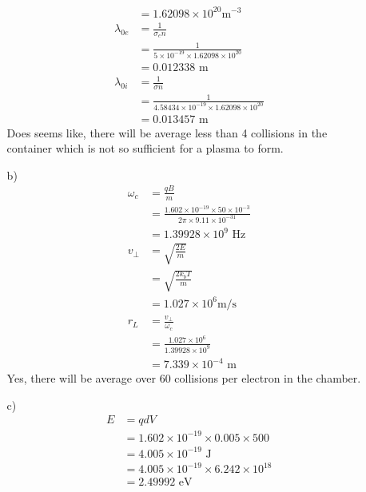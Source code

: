 \documentclass{article}
\begin{document}
\begin{itemize}
\begin{itemize}
\begin{align*}
            &=1.62098\times 10^{20} \text{m}^{-3}\\
            \lambda_{0e}&=\frac{1}{\sigma_e n}\\
            &=\frac{1}{5\times 10^{-19}\times 1.62098\times 10^{20}}\\
            &=0.012338 \text{ m}\\
            \lambda_{0i}&=\frac{1}{\sigma n}\\
            &=\frac{1}{4.58434\times 10^{-19}\times1.62098\times 10^{20} }\\
            &=0.013457 \text{ m}
        \end{align*}
        Does seems like, there will be average less than 4 collisions in the container which is not so sufficient for a plasma to form.
        \item [b)]
        \begin{align*}
            \omega_c&=\frac{qB}{m}\\
            &=\frac{1.602\times 10^{-19}\times50\times 10^{-3}}{2\pi\times 9.11\times 10^{-31}}\\
            &=1.39928\times 10^9 \text{ Hz}\\
            v_{\bot }&=\sqrt{\frac{2E}{m}}\\
            &=\sqrt{\frac{2k_bT}{m}}\\
            &=1.027\times 10^6 \text{m/s}\\
            r_L&=\frac{v_{\bot}}{\omega_c}\\
            &=\frac{1.027\times 10^6}{1.39928\times 10^9}\\
            &=7.339\times 10^{-4} \text{ m}
        \end{align*}
        Yes, there will be average over 60 collisions per electron in the chamber.
        \item[c)]
        \begin{align*}
            E &= qdV\\
            &= 1.602\times 10^{-19}\times 0.005 \times 500\\
            &=4.005\times 10^{-19}\text{ J}\\
            &=4.005\times 10^{-19}\times 6.242\times 10^{18}\\
            &=2.49992 \text{ eV}
        \end{align*}
    \end{itemize}
\end{itemize}
\end{document}
